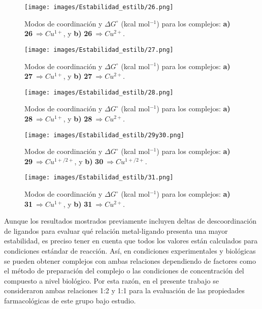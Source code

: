 \clearpage

\hspace{0cm}
\vfill
\begin{figure}[ht] 
\centering
\texttt{[image: images/Estabilidad\_estilb/26.png]}
\caption{Modos de coordinación y $\Delta G^{\circ}$ (kcal mol$^{-1}$) para los complejos: \textbf{a)} \textbf{26}$\ \Rightarrow Cu^{1+}$, y \textbf{b)} \textbf{26}$\ \Rightarrow Cu^{2+}$.}
\label{estcoord_26}
\end{figure}
\vfill
\hspace{0cm}

\begin{figure}[ht] 
\centering
\texttt{[image: images/Estabilidad\_estilb/27.png]}
\caption{Modos de coordinación y $\Delta G^{\circ}$ (kcal mol$^{-1}$) para los complejos: \textbf{a)} \textbf{27}$\ \Rightarrow Cu^{1+}$, y \textbf{b)} \textbf{27}$\ \Rightarrow Cu^{2+}$.}
\label{estcoord_27}
\end{figure}

\begin{figure}[ht] 
\centering
\centerline{\texttt{[image: images/Estabilidad\_estilb/28.png]}}
\caption{Modos de coordinación y $\Delta G^{\circ}$ (kcal mol$^{-1}$) para los complejos: \textbf{a)} \textbf{28}$\ \Rightarrow Cu^{1+}$, y \textbf{b)} \textbf{28}$\ \Rightarrow Cu^{2+}$.}
\label{estcoord_28}
\end{figure}

\begin{figure}[ht] 
\centering
\texttt{[image: images/Estabilidad\_estilb/29y30.png]}
\caption{Modos de coordinación y $\Delta G^{\circ}$ (kcal mol$^{-1}$) para los complejos: \textbf{a)} \textbf{29}$\ \Rightarrow Cu^{1+/2+}$, y \textbf{b)} \textbf{30}$\ \Rightarrow Cu^{1+/2+}$.}
\label{estcoord_29y30}
\end{figure}

\begin{figure}[ht] 
\centering
\centerline{\texttt{[image: images/Estabilidad\_estilb/31.png]}}
\caption{Modos de coordinación y $\Delta G^{\circ}$ (kcal mol$^{-1}$) para los complejos: \textbf{a)} \textbf{31}$\ \Rightarrow Cu^{1+}$, y \textbf{b)} \textbf{31}$\ \Rightarrow Cu^{2+}$.}
\label{estcoord_31}
\end{figure}

\clearpage

Aunque los resultados mostrados previamente incluyen deltas de descoordinación de ligandos para evaluar qué relación metal-ligando presenta una mayor estabilidad, es preciso tener en cuenta que todos los valores están calculados para condiciones estándar de reacción. Así, en condiciones experimentales y biológicas se pueden obtener complejos con ambas relaciones dependiendo de factores como el método de preparación del complejo o las condiciones de concentración del compuesto a nivel biológico. Por esta razón, en el presente trabajo se consideraron ambas relaciones 1:2 y 1:1 para la evaluación de las propiedades farmacológicas de este grupo bajo estudio.\\

